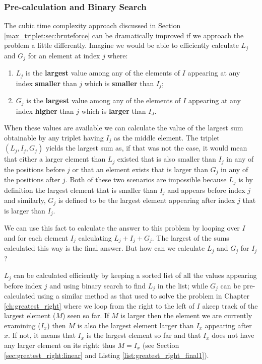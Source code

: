 \subsubsection{Pre-calculation and Binary Search}
The cubic time complexity approach discussed in Section \ref{max_triplet:sec:bruteforce} can be
dramatically improved if we approach the problem a little differently. Imagine we would be able to
efficiently calculate $L_j$ and $G_j$ for an element at index $j$ where:
\begin{enumerate}
	\item $L_j$ is the \textbf{largest} value among any of the elements of $I$ appearing at any
	index \textbf{smaller} than $j$ which is \textbf{smaller} than $I_j$;
	\item $G_j$ is the \textbf{largest} value among any of the elements of $I$ appearing at any
	index \textbf{higher} than $j$ which is \textbf{larger} than $I_J$.
\end{enumerate}
When these values are available we can calculate the value of the largest sum obtainable by any
triplet having $I_j$  as the middle element. The triplet $(L_j, I_j, G_j)$ yields the largest sum
as, if that was not the case, it would mean that either a larger element than $L_j$  existed that is also smaller
than $I_j$ in any of the positions before $j$ or that  an element exists that is larger than $G_j$
in any of the positions after $j$. 
Both of these two scenarios are impossible  because $L_j$ is by
definition the largest element that is smaller than $I_j$ and appears before index $j$  and
similarly,  $G_j$ is defined to be the largest element appearing after index $j$ that is larger
than $I_j$.

We can use this fact to calculate the answer to this problem by looping over $I$ and for each
element $I_j$ calculating $L_j+ I_j+ G_j$. The largest of the sums calculated this way is the final
answer. But how can we calculate $L_j$ and $G_j$ for $I_j$?

$L_j$ can be calculated efficiently by keeping a sorted list of all the values appearing before
index $j$ and using binary search to find $L_j$ in the list; while $G_j$ can be pre-calculated using a
similar method as that used to solve the problem in Chapter \ref{ch:greatest_right} where we loop
from the right to the left of $I$ akeep track of the largest element ($M$) seen so far. If $M$ is larger
then the element we are currently examining ($I_x$) then $M$ is also the largest element larger than $I_x$ appearing after $x$.
If not, it means that $I_x$ is the largest element so far and that $I_x$ does not have any larger element on its right: thus $M = I_x$ (see Section \ref{sec:greatest_right:linear} and Listing \ref{list:greatest_right_final1}).
